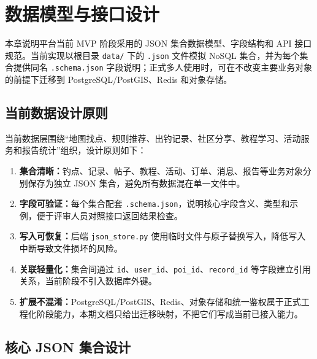 \section{数据模型与接口设计}

本章说明平台当前 MVP 阶段采用的 JSON 集合数据模型、字段结构和 API 接口规范。当前实现以根目录 \texttt{data/} 下的 \texttt{.json} 文件模拟 NoSQL 集合，并为每个集合提供同名 \texttt{.schema.json} 字段说明；正式多人使用时，可在不改变主要业务对象的前提下迁移到 PostgreSQL/PostGIS、Redis 和对象存储。

\subsection{当前数据设计原则}

当前数据层围绕“地图找点、规则推荐、出钓记录、社区分享、教程学习、活动服务和报告统计”组织，设计原则如下：

\begin{enumerate}
  \item \textbf{集合清晰：}钓点、记录、帖子、教程、活动、订单、消息、报告等业务对象分别保存为独立 JSON 集合，避免所有数据混在单一文件中。
  \item \textbf{字段可验证：}每个集合配套 \texttt{.schema.json}，说明核心字段含义、类型和示例，便于评审人员对照接口返回结果检查。
  \item \textbf{写入可恢复：}后端 \texttt{json\_store.py} 使用临时文件与原子替换写入，降低写入中断导致文件损坏的风险。
  \item \textbf{关联轻量化：}集合间通过 \texttt{id}、\texttt{user\_id}、\texttt{poi\_id}、\texttt{record\_id} 等字段建立引用关系，当前阶段不引入数据库外键。
  \item \textbf{扩展不混淆：}PostgreSQL/PostGIS、Redis、对象存储和统一鉴权属于正式工程化阶段能力，本期文档只给出迁移映射，不把它们写成当前已接入能力。
\end{enumerate}

\subsection{核心 JSON 集合设计}

